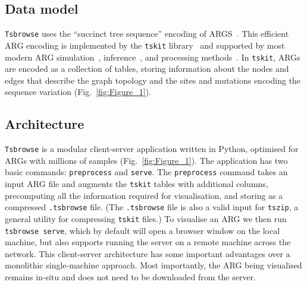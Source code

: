 \documentclass[unnumsec,webpdf,contemporary,large,namedate]{oup-authoring-template}%
\begin{document}
\subsection{Data model} \label{subsec:Data_Model} 
\texttt{Tsbrowse} uses the ``succinct tree sequence'' encoding of 
ARGS~\citep{wong2024general}. This efficient ARG encoding 
is implemented by the 
\texttt{tskit} library~\citep{ralph2020efficiently}
and supported by most modern ARG
simulation~\citep{kelleher2016efficient,kelleher2018efficient,
haller2019tree,baumdicker2022efficient,
adrion2020community,lauterbur2023expanding,korfmann2023weak,
tsambos2023link,tagami2024tstrait},
inference~\citep{kelleher2019inferring,speidel2019method,wohns2022unified,
mahmoudi2022bayesian,zhan2023towards,zhang2023biobank,deng2025general},
and processing methods~\citep{fan2022genealogical,nowbandegani2023extremely}.
In \texttt{tskit}, ARGs are encoded as a
collection of tables, storing information about the 
nodes and edges that describe the graph topology and the sites 
and mutations encoding the sequence variation (Fig.~\ref{fig:Figure_1}).

\subsection{Architecture} 
\texttt{Tsbrowse} is a modular client-server application 
written in Python, optimised for ARGs with millions
of samples (Fig.~\ref{fig:Figure_1}). 
The application has two basic commands: \texttt{preprocess}
and \texttt{serve}. The \texttt{preprocess} command 
takes an input ARG file and augments the \texttt{tskit} 
tables with additional columns,
precomputing all the information required for visualisation,
and storing as a compressed \texttt{.tsbrowse} file.
(The \texttt{.tsbrowse} file is also a valid input for 
\texttt{tszip}, a general utility for compressing \texttt{tskit}
files.)
To visualise an ARG we then run \texttt{tsbrowse serve}, which 
by default will open a browser window on the local machine, but 
also supports running the server on a remote machine across the 
network.
This client-server architecture has some important advantages over
a monolithic single-machine approach. Most importantly,
the ARG being visualised remains in-situ and does not need to be 
downloaded from the server. 
\end{document}
